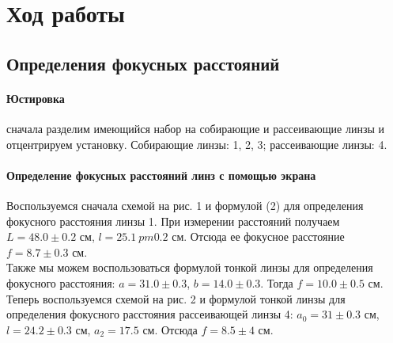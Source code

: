 \documentclass[a4paper,12pt]{article}
\theoremstyle{definition}
\begin{document}






\section*{Ход работы}
\subsection*{Определения фокусных расстояний}
\paragraph{Юстировка} сначала разделим имеющийся набор на собирающие и рассеивающие линзы и отцентрируем установку. Собирающие линзы: 1, 2, 3; рассеивающие линзы: 4.

\paragraph{Определение фокусных расстояний линз с помощью экрана}
Воспользуемся сначала схемой на рис. 1 и формулой (2) для определения фокусного расстояния линзы 1. При измерении расстояний получаем $L = 48.0 \pm 0.2$ см, $l = 25.1 \ pm 0.2$ см. Отсюда ее фокусное расстояние $f = 8.7 \pm 0.3$ см. \\
Также мы можем воспользоваться формулой тонкой линзы для определения фокусного расстояния: $a = 31.0 \pm 0.3$, $b = 14.0 \pm 0.3$. Тогда $f = 10.0 \pm 0.5$ см. \\
Теперь воспользуемся схемой на рис. 2 и формулой тонкой линзы для определения фокусного расстояния рассеивающей линзы 4: $a_0 = 31 \pm 0.3$ см, $l = 24.2 \pm 0.3$ см, $a_2 = 17.5$ см. Отсюда $f = 8.5 \pm 4$ см.
\end{document}

